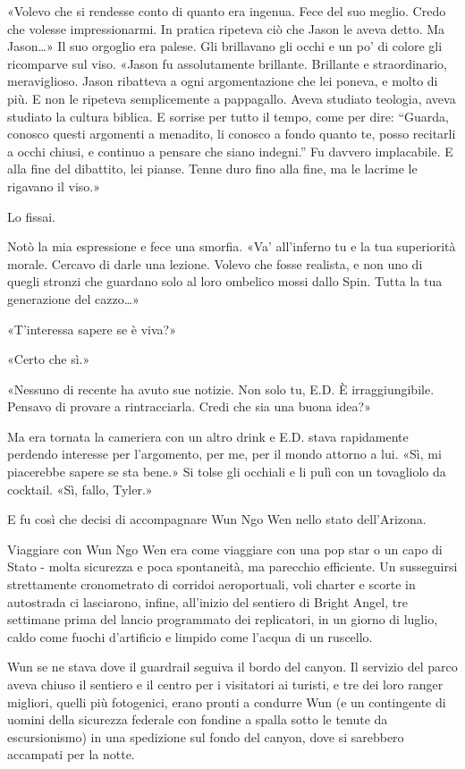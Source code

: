 «Volevo che si rendesse conto di quanto era ingenua. Fece del suo
meglio. Credo che volesse impressionarmi. In pratica ripeteva ciò che
Jason le aveva detto. Ma Jason\ldots» Il suo orgoglio era palese. Gli
brillavano gli occhi e un po' di colore gli ricomparve sul viso. «Jason
fu assolutamente brillante. Brillante e straordinario, meraviglioso.
Jason ribatteva a ogni argomentazione che lei poneva, e molto di più. E
non le ripeteva semplicemente a pappagallo. Aveva studiato teologia,
aveva studiato la cultura biblica. E sorrise per tutto il tempo, come
per dire: ``Guarda, conosco questi argomenti a menadito, li conosco a
fondo quanto te, posso recitarli a occhi chiusi, e continuo a pensare
che siano indegni.'' Fu davvero implacabile. E alla fine del dibattito,
lei pianse. Tenne duro fino alla fine, ma le lacrime le rigavano il
viso.»

Lo fissai.

Notò la mia espressione e fece una smorfia. «Va' all'inferno tu e la tua
superiorità morale. Cercavo di darle una lezione. Volevo che fosse
realista, e non uno di quegli stronzi che guardano solo al loro ombelico
mossi dallo Spin. Tutta la tua generazione del cazzo\ldots»

«T'interessa sapere se è viva?»

«Certo che sì.»

«Nessuno di recente ha avuto sue notizie. Non solo tu, E.D. È
irraggiungibile. Pensavo di provare a rintracciarla. Credi che sia una
buona idea?»

Ma era tornata la cameriera con un altro drink e E.D. stava rapidamente
perdendo interesse per l'argomento, per me, per il mondo attorno a lui.
«Sì, mi piacerebbe sapere se sta bene.» Si tolse gli occhiali e li pulì
con un tovagliolo da cocktail. «Sì, fallo, Tyler.»

E fu così che decisi di accompagnare Wun Ngo Wen nello stato
dell'Arizona.

\separatorefiori

Viaggiare con Wun Ngo Wen era come viaggiare con una pop star o un capo
di Stato - molta sicurezza e poca spontaneità, ma parecchio efficiente.
Un susseguirsi strettamente cronometrato di corridoi aeroportuali, voli
charter e scorte in autostrada ci lasciarono, infine, all'inizio del
sentiero di Bright Angel, tre settimane prima del lancio programmato dei
replicatori, in un giorno di luglio, caldo come fuochi d'artificio e
limpido come l'acqua di un ruscello.

Wun se ne stava dove il guardrail seguiva il bordo del canyon. Il
servizio del parco aveva chiuso il sentiero e il centro per i visitatori
ai turisti, e tre dei loro ranger migliori, quelli più fotogenici, erano
pronti a condurre Wun (e un contingente di uomini della sicurezza
federale con fondine a spalla sotto le tenute da escursionismo) in una
spedizione sul fondo del canyon, dove si sarebbero accampati per la
notte.

